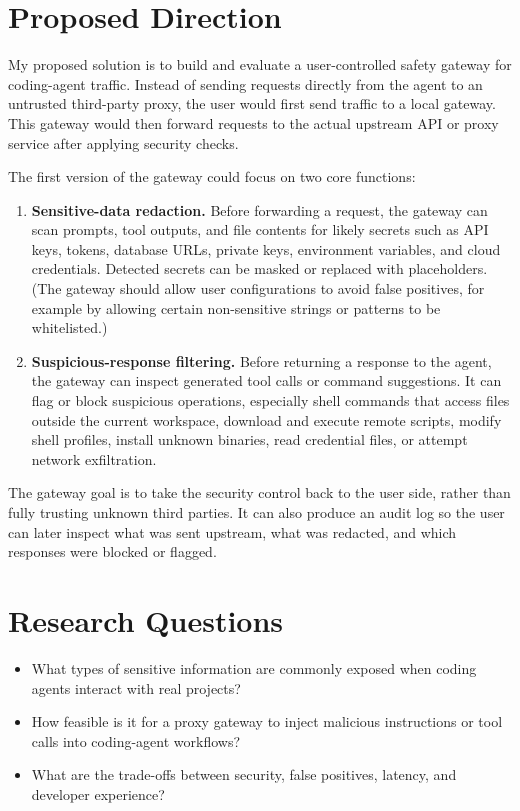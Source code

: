 \documentclass[11pt]{article}
\begin{document}
\section*{Proposed Direction}

My proposed solution is to build and evaluate a user-controlled safety gateway for coding-agent traffic. Instead of sending requests directly from the agent to an untrusted third-party proxy, the user would first send traffic to a local gateway. This gateway would then forward requests to the actual upstream API or proxy service after applying security checks.

The first version of the gateway could focus on two core functions:

\begin{enumerate}[leftmargin=*]
  \item \textbf{Sensitive-data redaction.} Before forwarding a request, the gateway can scan prompts, tool outputs, and file contents for likely secrets such as API keys, tokens, database URLs, private keys, environment variables, and cloud credentials. Detected secrets can be masked or replaced with placeholders. (The gateway should allow user configurations to avoid false positives, for example by allowing certain non-sensitive strings or patterns to be whitelisted.)
  \item \textbf{Suspicious-response filtering.} Before returning a response to the agent, the gateway can inspect generated tool calls or command suggestions. It can flag or block suspicious operations, especially shell commands that access files outside the current workspace, download and execute remote scripts, modify shell profiles, install unknown binaries, read credential files, or attempt network exfiltration.
\end{enumerate}

The gateway goal is to take the security control back to the user side, rather than fully trusting unknown third parties. It can also produce an audit log so the user can later inspect what was sent upstream, what was redacted, and which responses were blocked or flagged.

\section*{Research Questions}


\begin{itemize}[leftmargin=*]
  \item What types of sensitive information are commonly exposed when coding agents interact with real projects?
  \item How feasible is it for a proxy gateway to inject malicious instructions or tool calls into coding-agent workflows?
  \item What are the trade-offs between security, false positives, latency, and developer experience?
\end{itemize}
\end{document}
